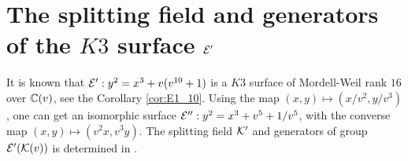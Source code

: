 \documentclass[11pt]{amsart}
\begin{document}
\section{The  splitting field and generators of the  $K3$ surface ${\mathcal E}'$}
\label{K3}

It is known that ${\mathcal E}': y^2=x^3+ v (v^{10}+1)$ is a $K3$ surface of Mordell-Weil rank $16$ over ${\mathbb C}(v)$, see the Corollary \ref{cor:E1_10}.
Using the map  $(x, y) \mapsto (x/v^2, y/v^3)$,   one can get an isomorphic surface 
${\mathcal E}'': y^2 =x^3 + v^5 + 1/v^5$, with  the converse map $(x,y) \mapsto (v^2 x, v^3 y)$.
The   splitting field  ${\mathcal K}'$  and generators of  group ${\mathcal E}'({\mathcal K}(v))$ is determined  
in \cite[Theorem 1.4]{salami2022generators}.
 
\end{document}
